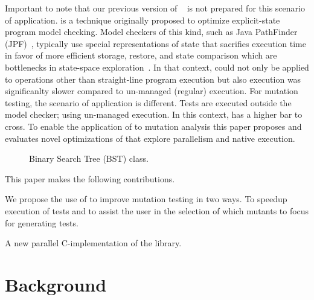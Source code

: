 \documentclass{sig-alternate}
\begin{document}
\sloppy

Important to note that our previous version of
\DE{}~\cite{damorim:issta2007,dAmorimLM08} is not prepared
for this scenario of application.  \DE{} is a technique originally
proposed to optimize explicit-state program model checking.  Model
checkers of this kind, such as Java PathFinder
(JPF)~\cite{visser03model}, typically use special representations of
state that sacrifies execution time in favor of more efficient
storage, restore, and state comparison which are bottlenecks in
state-space
exploration~\cite{damorim06:mixed-execution:icfem06,gvero-etal-icse2008}.
In that context, \DE{} could not only be applied to operations other
than straight-line program execution but also execution was
significanlty slower compared to un-managed (regular) execution.  For
mutation testing, the scenario of application is different.  Tests are
executed outside the model checker; using un-managed execution.  In
this context, \DE{} has a higher bar to cross.  To enable the
application of \DE{} to mutation analysis this paper proposes and
evaluates novel optimizations of \DE{} that explore parallelism and
native execution.

\subfiguretopcaptrue
\begin{figure}[t]
  \centering
  \begin{small}
    \subfigure{
      
    }
    \caption{\label{fig:example:tree}\label{fig:example:insert}Binary Search Tree (BST) class.}
  \end{small}
\end{figure}

This paper makes the following contributions.

 We propose the use of \dE{} to improve mutation testing
in two ways.  To speedup execution of tests and to assist the user in
the selection of which mutants to focus for generating tests.

 A new parallel C-implementation of the \dE{}
library.

 

\section{Background}
\end{document}
